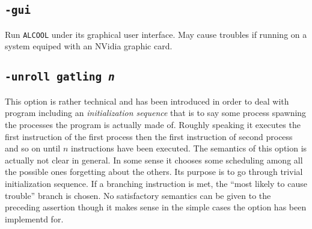\documentclass[article,11pt]{amsbook}
\def\alcool{\texttt{ALCOOL} }
\def\nvidia{{\sf NVidia} }
\begin{document}
\subsection{\texttt{-gui}} Run \alcool under its graphical user
interface. May cause troubles if running on a system equiped with an
\nvidia graphic card. 
\subsection{\texttt{-unroll gatling {\em n}}} This option is rather
technical and has been introduced in order to deal with program
including an {\em initialization sequence} that is to say some process
spawning the processes the program is actually made of. Roughly speaking
it executes the first instruction of the first process then the first
instruction of second process and so on until $n$ instructions have been
executed. The semantics of this option is actually not clear in
general. In some sense it chooses some scheduling among all the possible
ones forgetting about the others. Its purpose is to go through trivial
initialization sequence. If a branching instruction is met, the ``most
likely to cause trouble'' branch is chosen. No satisfactory semantics
can be given to the preceding assertion though it makes sense in the
simple cases the option has been implementd for.
 
\end{document}
